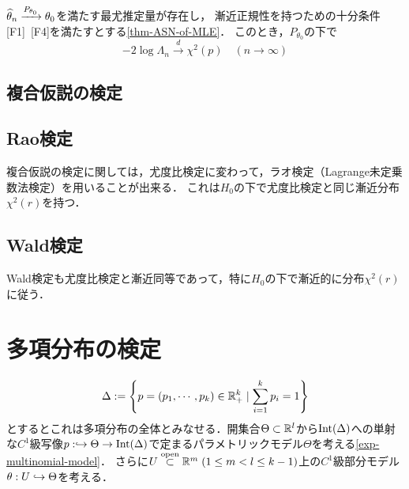 \documentclass[uplatex,dvipdfmx]{jsreport}
\begin{document}
\begin{theorem}
    $\widehat{\theta}_n\xrightarrow{P_{\theta_0}}\theta_0$を満たす最尤推定量が存在し，
    漸近正規性を持つための十分条件[F1]~[F4]を満たすとする\ref{thm-ASN-of-MLE}．
    このとき，$P_{\theta_0}$の下で
    \[-2\log\Lambda_n\xrightarrow{d}\chi^2(p)\quad(n\to\infty)\]
\end{theorem}

\subsection{複合仮説の検定}

\subsection{Rao検定}

\begin{tcolorbox}[colframe=ForestGreen, colback=ForestGreen!10!white,breakable,colbacktitle=ForestGreen!40!white,coltitle=black,fonttitle=\bfseries\sffamily,
title=]
    複合仮説の検定に関しては，尤度比検定に変わって，ラオ検定（Lagrange未定乗数法検定）を用いることが出来る．
    これは$H_0$の下で尤度比検定と同じ漸近分布$\chi^2(r)$を持つ．
\end{tcolorbox}

\subsection{Wald検定}

\begin{tcolorbox}[colframe=ForestGreen, colback=ForestGreen!10!white,breakable,colbacktitle=ForestGreen!40!white,coltitle=black,fonttitle=\bfseries\sffamily,
title=]
    Wald検定も尤度比検定と漸近同等であって，特に$H_0$の下で漸近的に分布$\chi^2(r)$に従う．
\end{tcolorbox}

\section{多項分布の検定}

\begin{notation}[モデルの設定]
    \[\Delta:=\left\{p=(p_1,\cdots,p_k)\in\mathbb{R}_+^k\mid\sum^k_{i=1}p_i=1\right\}\]
    とするとこれは多項分布の全体とみなせる．開集合$\Theta\subset\mathbb{R}^l$から$\mathrm{Int}(\Delta)$への単射な$C^1$級写像$p:\hookrightarrow\Theta\to\mathrm{Int}(\Delta)$で定まるパラメトリックモデル$\Theta$を考える\ref{exp-multinomial-model}．
    さらに$U\overset{\mathrm{open}}{\subset}\mathbb{R}^m\;(1\le m<l\le k-1)$上の$C^1$級部分モデル$\theta:U\hookrightarrow\Theta$を考える．
\end{notation}
\end{document}
